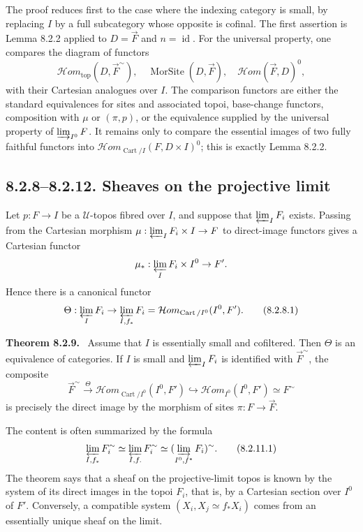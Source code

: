 \documentclass[11pt]{article}
\newcommand{\U}{\mathcal{U}}
\newcommand{\id}{\operatorname{id}}
\newcommand{\Cart}{\operatorname{Cart}}
\newenvironment{statement}[1]{\par\medskip\noindent\textbf{#1.}\ }{\par\medskip}
\begin{document}
The proof reduces first to the case where the indexing category is small, by replacing \(I\) by a full subcategory whose opposite is cofinal. The first assertion is Lemma 8.2.2 applied to \(D=\overrightarrow F\) and \(n=\id\). For the universal property, one compares the diagram of functors
\[
\mathcal{H}om_{\mathrm{top}}(D,\overrightarrow F^\sim),\quad
\operatorname{MorSite}(D,\overrightarrow F),\quad
\mathcal{H}om(\overrightarrow F,D)^0,
\]
with their Cartesian analogues over \(I\). The comparison functors are either the standard equivalences for sites and associated topoi, base-change functors, composition with \(\mu\) or \((\pi,p)\), or the equivalence supplied by the universal property of \(\varinjlim_{I^0}F\). It remains only to compare the essential images of two fully faithful functors into \(\mathcal{H}om_{\Cart/I}(F,D\times I)^0\); this is exactly Lemma 8.2.2.

\subsection*{8.2.8--8.2.12. Sheaves on the projective limit}
Let \(p:F\to I\) be a \(\U\)-topos fibred over \(I\), and suppose that \(\varprojlim_I F_i\) exists. Passing from the Cartesian morphism \(\mu:\varprojlim_I F_i\times I\to F\) to direct-image functors gives a Cartesian functor
\[
 \mu_*:\varprojlim_I F_i\times I^0\to F'.
\]
Hence there is a canonical functor
\[
 \Theta:\varprojlim_I F_i\to\varprojlim_{I,f_*}F_i=
 \mathcal{H}om_{\Cart/I^0}(I^0,F'). \tag{8.2.8.1}
\]

\begin{statement}{Theorem 8.2.9}
Assume that \(I\) is essentially small and cofiltered. Then \(\Theta\) is an equivalence of categories. If \(I\) is small and \(\varprojlim_I F_i\) is identified with \(\overrightarrow F^\sim\), the composite
\[
 \overrightarrow F^\sim\xrightarrow{\Theta}
 \mathcal{H}om_{\Cart/I^0}(I^0,F')
 \hookrightarrow \mathcal{H}om_{I^0}(I^0,F')\simeq F^\sim
\]
is precisely the direct image by the morphism of sites \(\pi:F\to\overrightarrow F\).
\end{statement}
The content is often summarized by the formula
\[
 \varprojlim_{I,f_*}F_i^{\sim}\simeq
 \varprojlim_{I,f.}F_i^{\sim}\simeq
 (\varinjlim_{I^0,f^*}F_i)^\sim. \tag{8.2.11.1}
\]
The theorem says that a sheaf on the projective-limit topos is known by the system of its direct images in the topoi \(F_i\), that is, by a Cartesian section over \(I^0\) of \(F'\). Conversely, a compatible system \((X_i, X_j\simeq f_*X_i)\) comes from an essentially unique sheaf on the limit.
\end{document}
